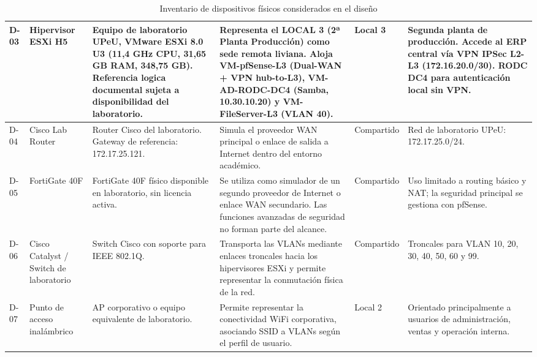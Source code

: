 \documentclass[11pt, a4paper, oneside]{report}
\begin{document}
\begin{landscape}
\begin{table}[p]
\begin{tabularx}{0.98\linewidth}{@{}|C{1.1cm}|L{3.3cm}|L{4.4cm}|X|C{2.3cm}|L{4.5cm}|@{}}
    {\small D-03} &
    {\small Hipervisor ESXi H5} &
    {\small Equipo de laboratorio UPeU, VMware ESXi 8.0 U3 (11,4 GHz CPU, 31,65 GB RAM, 348,75 GB). Referencia logica documental sujeta a disponibilidad del laboratorio.} &
    {\small Representa el LOCAL 3 (2ª Planta Producción) como sede remota liviana. Aloja VM-pfSense-L3 (Dual-WAN + VPN hub-to-L3), VM-AD-RODC-DC4 (Samba, 10.30.10.20) y VM-FileServer-L3 (VLAN 40).} &
    {\small Local 3} &
    {\small Segunda planta de producción. Accede al ERP central vía VPN IPSec L2-L3 (172.16.20.0/30). RODC DC4 para autenticación local sin VPN.} \\ \hline

    {\small D-04} &
    {\small Cisco Lab Router} &
    {\small Router Cisco del laboratorio. Gateway de referencia: 172.17.25.121.} &
    {\small Simula el proveedor WAN principal o enlace de salida a Internet dentro del entorno académico.} &
    {\small Compartido} &
    {\small Red de laboratorio UPeU: 172.17.25.0/24.} \\ \hline

    {\small D-05} &
    {\small FortiGate 40F} &
    {\small FortiGate 40F físico disponible en laboratorio, sin licencia activa.} &
    {\small Se utiliza como simulador de un segundo proveedor de Internet o enlace WAN secundario. Las funciones avanzadas de seguridad no forman parte del alcance.} &
    {\small Compartido} &
    {\small Uso limitado a routing básico y NAT; la seguridad principal se gestiona con pfSense.} \\ \hline

    {\small D-06} &
    {\small Cisco Catalyst / Switch de laboratorio} &
    {\small Switch Cisco con soporte para IEEE 802.1Q.} &
    {\small Transporta las VLANs mediante enlaces troncales hacia los hipervisores ESXi y permite representar la conmutación física de la red.} &
    {\small Compartido} &
    {\small Troncales para VLAN 10, 20, 30, 40, 50, 60 y 99.} \\ \hline

    {\small D-07} &
    {\small Punto de acceso inalámbrico} &
    {\small AP corporativo o equipo equivalente de laboratorio.} &
    {\small Permite representar la conectividad WiFi corporativa, asociando SSID a VLANs según el perfil de usuario.} &
    {\small Local 2} &
    {\small Orientado principalmente a usuarios de administración, ventas y operación interna.} \\ \hline

  \end{tabularx}

  \caption{Inventario de dispositivos físicos considerados en el diseño}
  \label{tab:inventario_dispositivos_fisicos}
\end{table}

\end{landscape}
\end{document}
